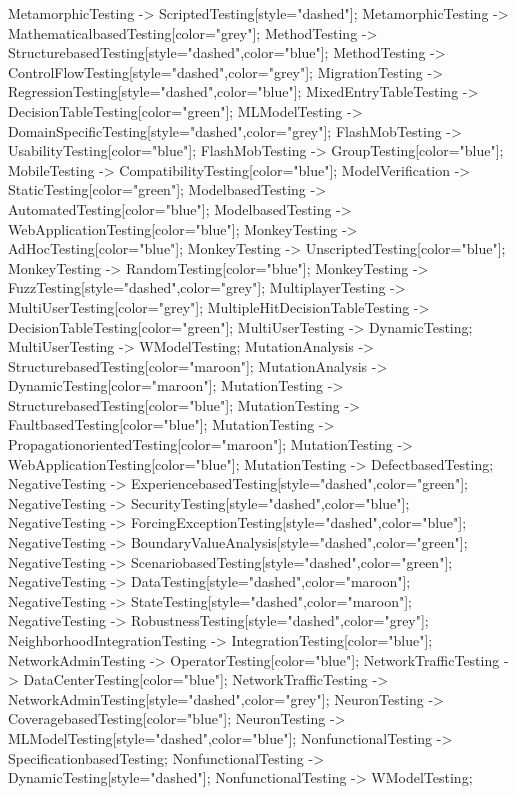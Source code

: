 \documentclass{article}
\begin{document}
{MetamorphicTesting -> ScriptedTesting[style="dashed"];
MetamorphicTesting -> MathematicalbasedTesting[color="grey"];
MethodTesting -> StructurebasedTesting[style="dashed",color="blue"];
MethodTesting -> ControlFlowTesting[style="dashed",color="grey"];
MigrationTesting -> RegressionTesting[style="dashed",color="blue"];
MixedEntryTableTesting -> DecisionTableTesting[color="green"];
MLModelTesting -> DomainSpecificTesting[style="dashed",color="grey"];
FlashMobTesting -> UsabilityTesting[color="blue"];
FlashMobTesting -> GroupTesting[color="blue"];
MobileTesting -> CompatibilityTesting[color="blue"];
ModelVerification -> StaticTesting[color="green"];
ModelbasedTesting -> AutomatedTesting[color="blue"];
ModelbasedTesting -> WebApplicationTesting[color="blue"];
MonkeyTesting -> AdHocTesting[color="blue"];
MonkeyTesting -> UnscriptedTesting[color="blue"];
MonkeyTesting -> RandomTesting[color="blue"];
MonkeyTesting -> FuzzTesting[style="dashed",color="grey"];
MultiplayerTesting -> MultiUserTesting[color="grey"];
MultipleHitDecisionTableTesting -> DecisionTableTesting[color="green"];
MultiUserTesting -> DynamicTesting;
MultiUserTesting -> WModelTesting;
MutationAnalysis -> StructurebasedTesting[color="maroon"];
MutationAnalysis -> DynamicTesting[color="maroon"];
MutationTesting -> StructurebasedTesting[color="blue"];
MutationTesting -> FaultbasedTesting[color="blue"];
MutationTesting -> PropagationorientedTesting[color="maroon"];
MutationTesting -> WebApplicationTesting[color="blue"];
MutationTesting -> DefectbasedTesting;
NegativeTesting -> ExperiencebasedTesting[style="dashed",color="green"];
NegativeTesting -> SecurityTesting[style="dashed",color="blue"];
NegativeTesting -> ForcingExceptionTesting[style="dashed",color="blue"];
NegativeTesting -> BoundaryValueAnalysis[style="dashed",color="green"];
NegativeTesting -> ScenariobasedTesting[style="dashed",color="green"];
NegativeTesting -> DataTesting[style="dashed",color="maroon"];
NegativeTesting -> StateTesting[style="dashed",color="maroon"];
NegativeTesting -> RobustnessTesting[style="dashed",color="grey"];
NeighborhoodIntegrationTesting -> IntegrationTesting[color="blue"];
NetworkAdminTesting -> OperatorTesting[color="blue"];
NetworkTrafficTesting -> DataCenterTesting[color="blue"];
NetworkTrafficTesting -> NetworkAdminTesting[style="dashed",color="grey"];
NeuronTesting -> CoveragebasedTesting[color="blue"];
NeuronTesting -> MLModelTesting[style="dashed",color="blue"];
NonfunctionalTesting -> SpecificationbasedTesting;
NonfunctionalTesting -> DynamicTesting[style="dashed"];
NonfunctionalTesting -> WModelTesting;
}
\end{document}
